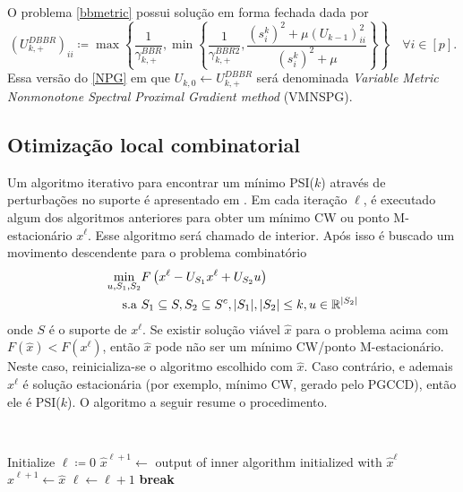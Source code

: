O problema \eqref{bbmetric} possui solução em
forma fechada dada por
\begin{equation*}
(U^{DBBR}_{k,+})_{ii} \coloneq 
\max\left\{\frac{1}{\gamma^{BBR}_{k,+}}, 
\min\left\{\frac{1}{\gamma^{BBR2}_{k,+}}, \frac{(s_i^k)^2 + \mu (U_{k-1})_{ii}^2}{(s_i^k)^2 + \mu}\right\} \right\}\quad \forall i\in [p].
\end{equation*}
Essa versão do \autoref{NPG} em que $U_{k,0}\gets U^{DBBR}_{k,+}$ será denominada \textit{Variable Metric Nonmonotone Spectral Proximal Gradient method} (VMNSPG).

\subsection{Otimização local combinatorial}
Um algoritmo iterativo para encontrar um mínimo PSI($k$) através de perturbações no suporte é apresentado em \cite{fastselect}. Em cada iteração $\ell$, é executado algum dos algoritmos anteriores para obter um mínimo CW ou ponto M-estacionário $x^\ell$. Esse algoritmo será chamado de interior. Após isso é buscado um movimento descendente para o problema combinatório
\begin{equation}
\begin{aligned}
\min_{u, S_1, S_2} &  F\left(x^\ell - U_{S_1} x^\ell + U_{S_2} u\right) \\
\text{s.a } &  S_1 \subseteq S, S_2 \subseteq S^c,  |S_1|, |S_2| \leq k, u\in\mathbb{R}^{|S_2|}
\end{aligned}\label{psik}
\end{equation}
onde $S$ é o suporte de $x^\ell$. Se existir solução viável $\hat{x}$ para o problema acima com $F(\hat{x}) < F(x^\ell)$, então $\hat{x}$ pode não ser um mínimo CW/ponto M-estacionário. Neste caso, reinicializa-se o algoritmo escolhido com $\hat{x}$. Caso contrário, e ademais $x^\ell$ é solução estacionária (por exemplo, mínimo CW, gerado pelo PGCCD), então ele é PSI($k$). O algoritmo a seguir resume o procedimento.

\begin{algorithm}[H]
\caption{\textit{Composite Partial Swap Inescapable of order $k$ method} (CPSI($k$))}
\label{alg:cpsi}
\\
\begin{algorithmic}[1]
    \State Initialize $\ell\coloneq 0$
        \State $\hat{x}^{\ell+1} \gets$ output of inner algorithm initialized with $\hat{x}^\ell$
            \State $\hat{x}^{\ell+1} \gets \hat{x}$
            \State $\ell\gets \ell+1$
        \Else
            \State \textbf{break}
        \EndIf
    \EndWhile
\end{algorithmic}
\end{algorithm}

